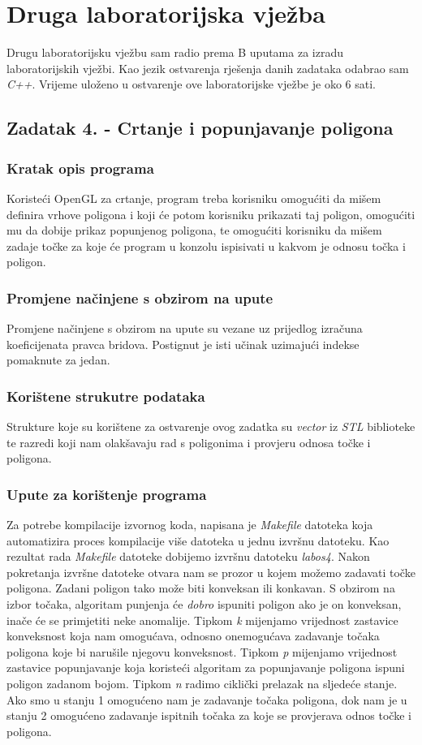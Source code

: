 \documentclass[oneside]{scrbook}
\begin{document}
\chapter{Druga laboratorijska vježba}
Drugu laboratorijsku vježbu sam radio prema B uputama za izradu laboratorijskih vježbi. Kao jezik ostvarenja rješenja danih zadataka odabrao sam \textit{C++}. Vrijeme uloženo u ostvarenje ove laboratorijske vježbe je oko 6 sati. 

\section{Zadatak 4. - Crtanje i popunjavanje poligona}
\subsection{Kratak opis programa}
Koristeći OpenGL za crtanje, program treba korisniku omogućiti da mišem definira vrhove poligona i koji će potom korisniku prikazati taj poligon, omogućiti mu da dobije prikaz popunjenog poligona, te omogućiti korisniku da mišem zadaje točke za koje će program u konzolu ispisivati u kakvom je odnosu točka i poligon.

\subsection{Promjene načinjene s obzirom na upute}
Promjene načinjene s obzirom na upute su vezane uz prijedlog izračuna koeficijenata pravca bridova. Postignut je isti učinak uzimajući indekse pomaknute za jedan.

\subsection{Korištene strukutre podataka}
Strukture koje su korištene za ostvarenje ovog zadatka su \textit{vector} iz \textit{STL} biblioteke te razredi koji nam olakšavaju rad s poligonima i provjeru odnosa točke i poligona.

\subsection{Upute za korištenje programa}
Za potrebe kompilacije izvornog koda, napisana je \textit{Makefile} datoteka koja automatizira proces kompilacije više datoteka u jednu izvršnu datoteku. Kao rezultat rada \textit{Makefile} datoteke dobijemo izvršnu datoteku \textit{labos4}. Nakon pokretanja izvršne datoteke otvara nam se prozor u kojem možemo zadavati točke poligona. Zadani poligon tako može biti konveksan ili konkavan. S obzirom na izbor točaka, algoritam punjenja će \textit{dobro} ispuniti poligon ako je on konveksan, inače će se primjetiti neke anomalije. Tipkom \textit{k} mijenjamo vrijednost zastavice konveksnost koja nam omogućava, odnosno onemogućava zadavanje točaka poligona koje bi narušile njegovu konveksnost. Tipkom \textit{p} mijenjamo vrijednost zastavice popunjavanje koja koristeći algoritam za popunjavanje poligona ispuni poligon zadanom bojom. Tipkom \textit{n} radimo ciklički prelazak na sljedeće stanje. Ako smo u stanju 1 omogućeno nam je zadavanje točaka poligona, dok nam je u stanju 2 omogućeno zadavanje ispitnih točaka za koje se provjerava odnos točke i poligona.
\end{document}
